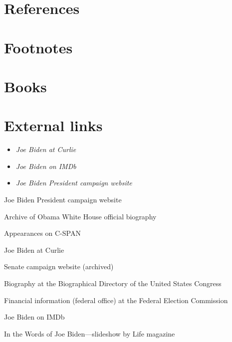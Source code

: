 \section{References}\label{references}

\section{Footnotes}\label{footnotes}

\section{Books}\label{books}

\section{External links}\label{external-links}

\begin{itemize}
\item
  \emph{Joe Biden at Curlie}
\item
  \emph{Joe Biden on IMDb}
\item
  \emph{Joe Biden President campaign website}
\end{itemize}

Joe Biden President campaign website

Archive of Obama White House official biography

Appearances on C-SPAN

Joe Biden at Curlie

Senate campaign website (archived)

Biography at the Biographical Directory of the United States Congress

Financial information (federal office) at the Federal Election
Commission

Joe Biden on IMDb

In the Words of Joe Biden---slideshow by Life magazine
